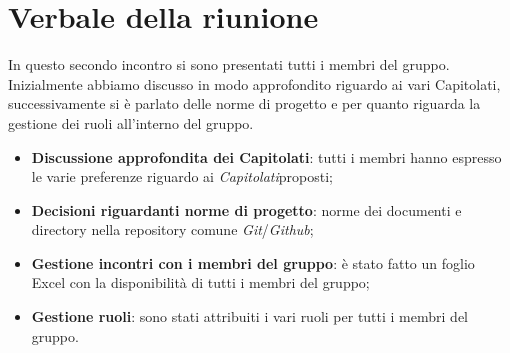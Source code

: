 \section{Verbale della riunione}
		In questo secondo incontro si sono presentati tutti i membri del gruppo. Inizialmente abbiamo discusso in modo approfondito riguardo ai vari Capitolati\glos, successivamente si è parlato delle norme di progetto e per quanto riguarda la gestione dei ruoli all'interno del gruppo.
	\begin{itemize}
		\item \textbf {Discussione approfondita dei Capitolati\glos}: tutti i membri hanno espresso le varie preferenze riguardo ai \textit{Capitolati}\glo proposti;
		\item \textbf {Decisioni riguardanti norme di progetto}: norme dei documenti e directory nella repository comune \textit{Git}\glos/\textit{Github}\glos;
		\item \textbf {Gestione incontri con i membri del gruppo}: è stato fatto un foglio Excel con la disponibilità di tutti i membri del gruppo;
		\item \textbf {Gestione ruoli}: sono stati attribuiti i vari ruoli per tutti i membri del gruppo.
	\end{itemize}
